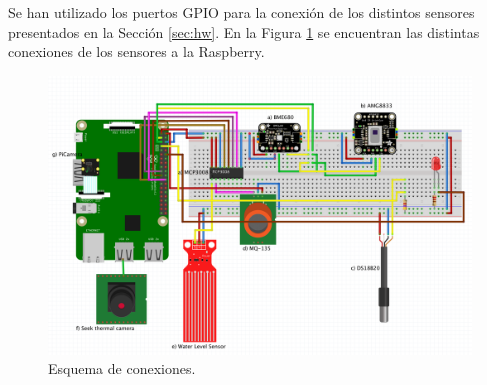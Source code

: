 Se han utilizado los puertos GPIO para la conexión de los distintos sensores presentados en la Sección \ref{sec:hw}. En la Figura \ref{fig:esquema} se encuentran las distintas conexiones de los sensores a la Raspberry.\\
\begin{figure} [h!]
  \begin{center}
    \includegraphics[width=16cm]{figs/esquema}
  \end{center}
  \caption{Esquema de conexiones.}
  \label{fig:esquema}
\end{figure}

